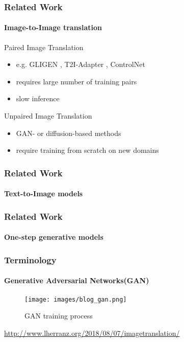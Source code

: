 \documentclass[aspectratio=169, lecture, amberg]{OTHAWbeamer}
\begin{document}
\begin{frame}
\frametitle{Related Work}
\framesubtitle{Image-to-Image translation}
Paired Image Translation
\begin{itemize}
    \item e.g. GLIGEN \cite{li2023gligen}, T2I-Adapter \cite{mou2023t2i}, ControlNet \cite{zhang2023adding}
    \item requires large number of training pairs
    \item slow inference
\end{itemize}
Unpaired Image Translation
\begin{itemize}
    \item GAN- or diffusion-based methods \cite{cyclediffusion} \cite{su2022dual} \cite{sasaki2021unitddpm}
    \item require training from scratch on new domains   
\end{itemize}
\end{frame}

\begin{frame}
\frametitle{Related Work}
\framesubtitle{Text-to-Image models}

\end{frame}

\begin{frame}
\frametitle{Related Work}
\framesubtitle{One-step generative models}

\end{frame}

\begin{frame}
\frametitle{Terminology}
\framesubtitle{Generative Adversarial Networks(GAN)}
\begin{figure}
    \centering
    \texttt{[image: images/blog\_gan.png]}
    \caption{GAN training process}
\end{figure}
\tiny{\footnotemark \url{http://www.lherranz.org/2018/08/07/imagetranslation/}}
\end{frame}
\note{}
\end{document}
